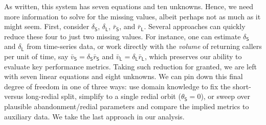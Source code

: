 \documentclass[manuscript,screen,authorversion]{acmart}
\begin{document}
As written, this system has seven equations and ten unknowns. Hence, we need more information to solve for the missing values, albeit perhaps not as much as it might seem. First, consider $\delta_\mathsf{S}$, $\delta_\mathsf{L}$, $\bar{r}_\mathsf{S}$, and $\bar{r}_\mathsf{L}$. Several approaches can quickly reduce these four to just two missing values. For instance, one can estimate $\delta_\mathsf{S}$ and $\delta_\mathsf{L}$ from time-series data, or work directly with the \emph{volume} of returning callers per unit of time, say $\bar{v}_\mathsf{S} = \delta_\mathsf{S} \bar{r}_\mathsf{S}$ and $\bar{v}_\mathsf{L} = \delta_\mathsf{L} \bar{r}_\mathsf{L}$, which preserves our ability to evaluate key performance metrics. 
Taking such reduction for granted, we are left with seven linear equations and eight unknowns. We can %
pin down this final degree of freedom %
in one of three ways: use domain knowledge to fix the short- versus long-redial split, simplify to a single redial orbit ($\theta_\mathsf{S}=0$), or sweep over plausible abandonment/redial parameters and compare the implied metrics to auxiliary data. We take the last approach in our analysis.
\end{document}
